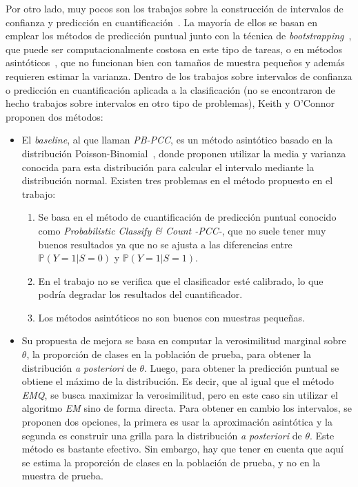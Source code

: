 Por otro lado, muy pocos son los trabajos sobre la construcción de intervalos de
confianza y predicción en cuantificación~\cite{tasche2019confidence}. La mayoría
de ellos se basan en emplear los métodos de predicción puntual junto con la
técnica de {\it bootstrapping\/}~\cite{hopkins2010method,
daughton2020constructing, daughton2021bootstrapping}, que puede ser
computacionalmente costosa en este tipo de tareas, o en métodos
asintóticos~\cite{vaz2019quantification}, que no funcionan bien con tamaños de
muestra pequeños y además requieren estimar la varianza. Dentro de los trabajos
sobre intervalos de confianza o predicción en cuantificación aplicada a la
clasificación (no se encontraron de hecho trabajos sobre intervalos en otro tipo
de problemas), Keith y O'Connor~\cite{keith2018uncertainty} proponen dos
métodos:

\begin{itemize}
    \item El {\it baseline}, al que llaman {\it PB-PCC}, es un método asintótico
    basado en la distribución Poisson-Binomial~\cite{le1960approximation,
    wang1993number}, donde proponen utilizar la media y varianza conocida para
    esta distribución para calcular el intervalo mediante la distribución
    normal. Existen tres problemas en el método propuesto en el trabajo:
        \begin{enumerate}
            \item Se basa en el método de cuantificación de predicción puntual
            conocido como {\it Probabilistic Classify \& Count -PCC-}, que no
            suele tener muy buenos resultados ya que no se ajusta a las
            diferencias entre $\mathbb{P}(Y=1|S=0)$ y
            $\mathbb{P}(Y=1|S=1)$.\label{keith_item_uno}
            \item En el trabajo no se verifica que el clasificador esté
            calibrado, lo que podría degradar los resultados del
            cuantificador.\label{keith_item_dos}
            \item Los métodos asintóticos no son buenos con muestras pequeñas.
        \end{enumerate}
    \item Su propuesta de mejora se basa en computar la verosimilitud marginal
    sobre $\theta$, la proporción de clases en la población de prueba, para
    obtener la distribución {\it a posteriori\/} de $\theta$. Luego, para
    obtener la predicción puntual se obtiene el máximo de la distribución. Es
    decir, que al igual que el método {\it EMQ}, se busca maximizar la
    verosimilitud, pero en este caso sin utilizar el algoritmo {\it EM\/} sino
    de forma directa. Para obtener en cambio los intervalos, se proponen dos
    opciones, la primera es usar la aproximación asintótica y la segunda es
    construir una grilla para la distribución {\it a posteriori\/} de $\theta$.
    Este método es bastante efectivo. Sin embargo, hay que tener en cuenta que
    aquí se estima la proporción de clases en la población de prueba, y no en la
    muestra de prueba.
\end{itemize}

